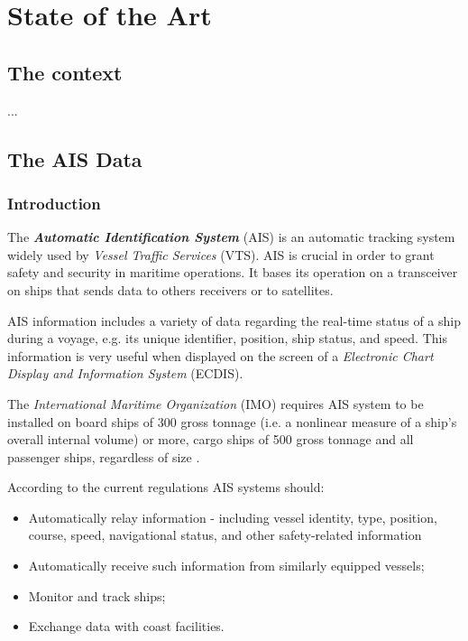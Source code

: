 \chapter{State of the Art}

\section{The context}

    ...
    
\newpage
\section{The AIS Data}

    \subsection{Introduction}
    
    The \textit{\textbf{Automatic Identification System}} (AIS) is an automatic tracking system widely used by \textit{Vessel Traffic Services} (VTS). AIS is crucial in order to grant safety and security in maritime operations.
    It bases its operation on a transceiver on ships that sends data to others receivers or to satellites.
    
    AIS information includes a variety of data regarding the real-time status of a ship during a voyage, e.g. its unique identifier, position, ship status, and speed. This information is very useful when displayed on the screen of a \textit{Electronic Chart Display and Information System} (ECDIS).
    
    The \textit{International Maritime Organization} (IMO) requires AIS system to be installed on board ships of 300 gross tonnage (i.e. a nonlinear measure of a ship's overall internal volume) or more, cargo ships of 500 gross tonnage and all passenger ships, regardless of size \cite{ais_regulations}.
    
    According to the current regulations AIS systems should:
    \begin{itemize}
        \item Automatically relay information - including vessel identity, type, position, course, speed, navigational status, and other safety-related information
        \item Automatically receive such information from similarly equipped vessels; 
        \item Monitor and track ships;
        \item Exchange data with coast facilities.
    \end{itemize}

